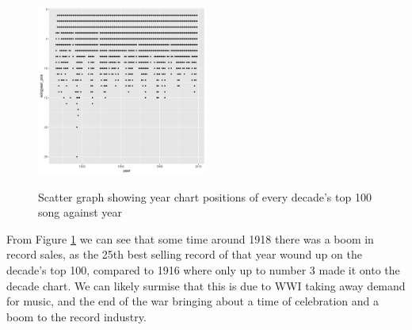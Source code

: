 \documentclass[12pt]{article}
\newcommand{\myfig}{\begin{figure}}
\begin{document}
        \myfig
          \caption{Scatter graph showing year chart positions of every decade's top 100 song against year}
          \includegraphics[width=0.5\textwidth]{yearDecade2}
          \label{fig:q4p3}
        \end{figure}

        From Figure \ref{fig:q4p3} we can see that some time around 1918 there was a boom in record sales, as the 25th best selling record of that year wound up on the decade's top 100, compared to 1916 where only up to number 3 made it onto the decade chart.
        We can likely surmise that this is due to WWI taking away demand for music, and the end of the war bringing about a time of celebration and a boom to the record industry.
\end{document}
